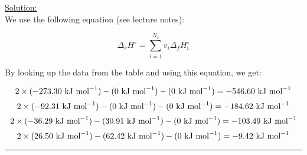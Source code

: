 \noindent
\underline{Solution:}\\

We use the following equation (see lecture notes):

$$\Delta_r H^\circ = \sum\limits_{i=1}^{N_s}v_i\Delta_fH_i^\circ$$

By looking up the data from the table and using this equation, we get:

$$2 \times (-273.30\textnormal{ kJ mol}^{-1}) - (0\textnormal{ kJ mol}^{-1}) - (0\textnormal{ kJ mol}^{-1})= -546.60\textnormal{ kJ mol}^{-1}$$
$$2 \times (-92.31\textnormal{ kJ mol}^{-1}) - (0\textnormal{ kJ mol}^{-1}) - (0\textnormal{ kJ mol}^{-1}) = -184.62\textnormal{ kJ mol}^{-1}$$
$$2 \times (-36.29\textnormal{ kJ mol}^{-1}) - (30.91\textnormal{ kJ mol}^{-1}) - (0\textnormal{ kJ mol}^{-1}) = -103.49\textnormal{ kJ mol}^{-1}$$
$$2 \times (26.50\textnormal{ kJ mol}^{-1}) - (62.42\textnormal{ kJ mol}^{-1}) - (0\textnormal{ kJ mol}^{-1}) = -9.42\textnormal{ kJ mol}^{-1}$$

\hrule\vspace{0.5cm}
